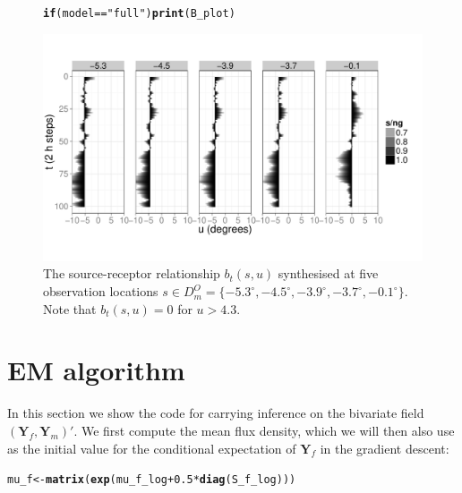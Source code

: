 \documentclass[a4paper,11pt]{article}\usepackage[]{graphicx}\usepackage[]{color}
\makeatletter
\def\maxwidth{ %
  \ifdim\Gin@nat@width>\linewidth
    \linewidth
  \else
    \Gin@nat@width
  \fi
}
\newcommand{\hlnum}[1]{\textcolor[rgb]{0.686,0.059,0.569}{#1}}%
\newcommand{\hlstr}[1]{\textcolor[rgb]{0.192,0.494,0.8}{#1}}%
\newcommand{\hlopt}[1]{\textcolor[rgb]{0,0,0}{#1}}%
\newcommand{\hlstd}[1]{\textcolor[rgb]{0.345,0.345,0.345}{#1}}%
\newcommand{\hlkwa}[1]{\textcolor[rgb]{0.161,0.373,0.58}{\textbf{#1}}}%
\newcommand{\hlkwb}[1]{\textcolor[rgb]{0.69,0.353,0.396}{#1}}%
\newcommand{\hlkwd}[1]{\textcolor[rgb]{0.737,0.353,0.396}{\textbf{#1}}}%
\newenvironment{kframe}{%
 \def\at@end@of@kframe{}%
 \ifinner\ifhmode%
  \def\at@end@of@kframe{\end{minipage}}%
  \begin{minipage}{\columnwidth}%
 \fi\fi%
 \def\FrameCommand##1{\hskip\@totalleftmargin \hskip-\fboxsep
 \colorbox{shadecolor}{##1}\hskip-\fboxsep
     \hskip-\linewidth \hskip-\@totalleftmargin \hskip\columnwidth}%
 \MakeFramed {\advance\hsize-\width
   \@totalleftmargin\z@ \linewidth\hsize
   \@setminipage}}%
 {\par\unskip\endMakeFramed%
 \at@end@of@kframe}
\newenvironment{knitrout}{}{} %
\newcommand{\Yvec}{\mathbf{Y}}
\makeatother
\begin{document}
\begin{figure}
\begin{center}
\begin{knitrout}
\color{fgcolor}\begin{kframe}
\begin{alltt}
\hlkwa{if}\hlstd{(model} \hlopt{==} \hlstr{"full"}\hlstd{)} \hlkwd{print}\hlstd{(B_plot)}
\end{alltt}
\end{kframe}
\includegraphics[width=\maxwidth]{figure/B-plot-1} 

\end{knitrout}
\end{center}
\caption{ The source-receptor relationship $b_t(s,u)$ synthesised at five observation locations $s \in D^O_m = \{-5.3^\circ, -4.5^\circ,-3.9^\circ,-3.7^\circ,-0.1^\circ \}$. Note that $b_t(s,u) = 0$ for $u > 4.3$.}
\label{fig:B}
\end{figure}






\section{EM algorithm}

In this section we show the code for carrying inference on the bivariate field $(\Yvec_f,\Yvec_m)'$. We first compute the mean flux density, which we will then also use as the initial value for the conditional expectation of $\Yvec_f$ in the gradient descent:


\begin{knitrout}
\color{fgcolor}\begin{kframe}
\begin{alltt}
\hlstd{mu_f} \hlkwb{<-} \hlkwd{matrix}\hlstd{(}\hlkwd{exp}\hlstd{(mu_f_log} \hlopt{+} \hlnum{0.5}\hlopt{*}\hlkwd{diag}\hlstd{(S_f_log)))}
\end{alltt}
\end{kframe}
\end{knitrout}
\end{document}
